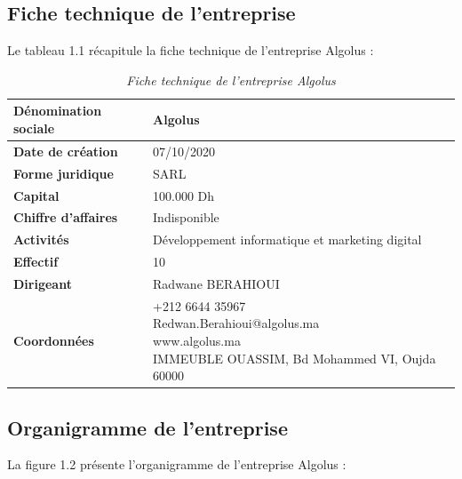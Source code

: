 \documentclass[12pt,a4paper]{report}
\begin{document}
	\subsection{Fiche technique de l'entreprise}
	
	Le tableau 1.1 récapitule la fiche technique de l'entreprise Algolus :
	
	\begin{table}[htbp]
		\centering
		\caption{\textit{Fiche technique de l'entreprise Algolus}}
		\begin{tabular}{|l|l|}
			\hline
			\textbf{Dénomination sociale} & Algolus \\
			\hline
			\textbf{Date de création} & 07/10/2020 \\
			\hline
			\textbf{Forme juridique} & SARL \\
			\hline
			\textbf{Capital} & 100.000 Dh \\
			\hline
			\textbf{Chiffre d'affaires} & Indisponible \\
			\hline
			\textbf{Activités} & Développement informatique et marketing digital \\
			\hline
			\textbf{Effectif} & 10 \\
			\hline
			\textbf{Dirigeant} & Radwane BERAHIOUI \\
			\hline
			\textbf{Coordonnées} & \makecell[l]{+212 6644 35967 \\ Redwan.Berahioui@algolus.ma \\ www.algolus.ma \\ IMMEUBLE OUASSIM, Bd Mohammed VI, Oujda 60000} \\
			\hline
		\end{tabular}
		\label{tab:fiche-technique-algolus}  %
	\end{table}
	
	\subsection{Organigramme de l’entreprise}
	
	La figure 1.2 présente l'organigramme de l'entreprise Algolus :
	
\end{document}
